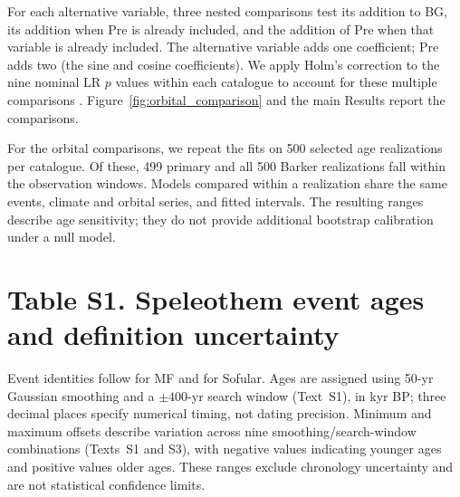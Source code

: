 \documentclass[11pt]{article}
\begin{document}
For each alternative variable, three nested comparisons test its addition to BG, its addition when Pre is already included, and the addition of Pre when that variable is already included. The alternative variable adds one coefficient; Pre adds two (the sine and cosine coefficients). We apply Holm's correction to the nine nominal LR $p$ values within each catalogue to account for these multiple comparisons \citep{holm1979simple}. Figure~\ref{fig:orbital_comparison} and the main Results report the comparisons. 

For the orbital comparisons, we repeat the fits on 500 selected age realizations per catalogue. Of these, 499 primary and all 500 Barker realizations fall within the observation windows. Models compared within a realization share the same events, climate and orbital series, and fitted intervals. The resulting ranges describe age sensitivity; they do not provide additional bootstrap calibration under a null model.

\clearpage
\setcounter{table}{0}\label{tab:S1}
\section*{Table S1. Speleothem event ages and definition uncertainty}
\noindent Event identities follow \citet{fohlmeister2023role} for MF and \citet{held2024dansgaard} for Sofular. Ages are assigned using 50-yr Gaussian smoothing and a $\pm400$-yr search window (Text~S1), in kyr BP; three decimal places specify numerical timing, not dating precision. Minimum and maximum offsets describe variation across nine smoothing/search-window combinations (Texts~S1 and S3), with negative values indicating younger ages and positive values older ages. These ranges exclude chronology uncertainty and are not statistical confidence limits.
\end{document}
